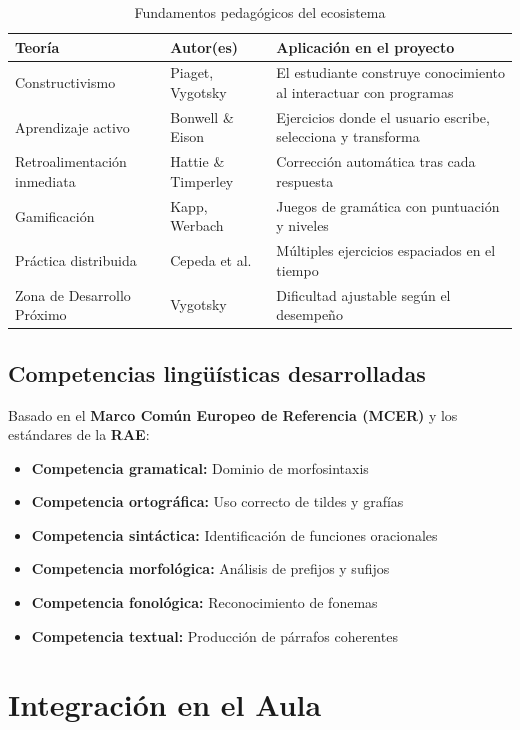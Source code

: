 \documentclass[12pt,spanish]{article}
\begin{document}
\begin{table}[H]
\centering
\caption{Fundamentos pedagógicos del ecosistema}
\label{tab:pedagogia}
\begin{tabular}{|p{3.5cm}|p{4cm}|p{6cm}|}
\hline
\textbf{Teoría} & \textbf{Autor(es)} & \textbf{Aplicación en el proyecto} \\
\hline
Constructivismo & Piaget, Vygotsky & El estudiante construye conocimiento al interactuar con programas \\
\hline
Aprendizaje activo & Bonwell \& Eison & Ejercicios donde el usuario escribe, selecciona y transforma \\
\hline
Retroalimentación inmediata & Hattie \& Timperley & Corrección automática tras cada respuesta \\
\hline
Gamificación & Kapp, Werbach & Juegos de gramática con puntuación y niveles \\
\hline
Práctica distribuida & Cepeda et al. & Múltiples ejercicios espaciados en el tiempo \\
\hline
Zona de Desarrollo Próximo & Vygotsky & Dificultad ajustable según el desempeño \\
\hline
\end{tabular}
\end{table}

\subsection{Competencias lingüísticas desarrolladas}

Basado en el \textbf{Marco Común Europeo de Referencia (MCER)} y los estándares de la \textbf{RAE}:

\begin{itemize}
    \item \textbf{Competencia gramatical:} Dominio de morfosintaxis
    \item \textbf{Competencia ortográfica:} Uso correcto de tildes y grafías
    \item \textbf{Competencia sintáctica:} Identificación de funciones oracionales
    \item \textbf{Competencia morfológica:} Análisis de prefijos y sufijos
    \item \textbf{Competencia fonológica:} Reconocimiento de fonemas
    \item \textbf{Competencia textual:} Producción de párrafos coherentes
\end{itemize}

\section{Integración en el Aula}
\end{document}
